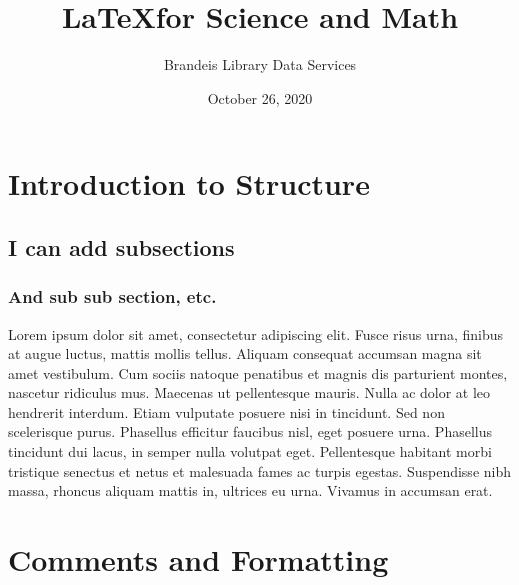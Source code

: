 \documentclass{article}
\title{\LaTeX for Science and Math}
\author{Brandeis Library Data Services }
\date{October 26, 2020}
\begin{document}


\maketitle

\tableofcontents

\pagebreak

\section{Introduction to Structure}
\subsection{I can add subsections}
\subsubsection{And sub sub section, etc.}

Lorem ipsum dolor sit amet, consectetur adipiscing elit. Fusce risus
urna, finibus at augue luctus, mattis mollis tellus. Aliquam consequat
accumsan magna sit amet vestibulum. Cum sociis natoque penatibus et
magnis dis parturient montes, nascetur ridiculus mus. Maecenas ut
pellentesque mauris. Nulla ac dolor at leo hendrerit interdum. Etiam
vulputate posuere nisi in tincidunt. Sed non scelerisque purus. Phasellus
efficitur faucibus nisl, eget posuere urna. Phasellus tincidunt dui
lacus, in semper nulla volutpat eget. Pellentesque habitant morbi
tristique senectus et netus et malesuada fames ac turpis egestas.
Suspendisse nibh massa, rhoncus aliquam mattis in, ultrices eu urna.
Vivamus in accumsan erat.

\section{Comments and Formatting}

\end{document}

